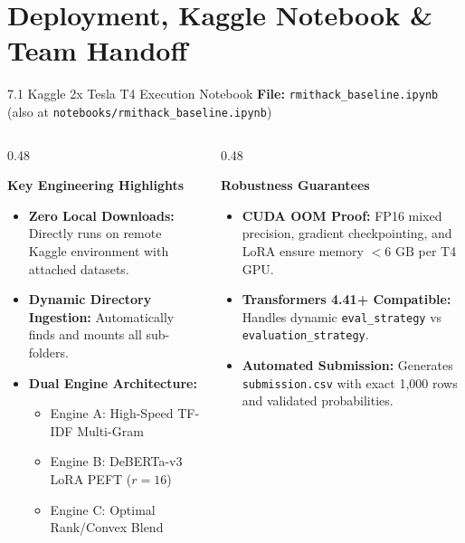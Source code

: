 \documentclass[aspectratio=169]{beamer}
\begin{document}
\section{Deployment, Kaggle Notebook \& Team Handoff}

\begin{frame}{7.1 Kaggle 2x Tesla T4 Execution Notebook}
\textbf{File:} \texttt{rmithack\_baseline.ipynb} (also at \texttt{notebooks/rmithack\_baseline.ipynb})

\vspace{0.25cm}
\begin{columns}[T]
\begin{column}{0.48\textwidth}
\begin{block}{\textbf{Key Engineering Highlights}}
\begin{itemize}
    \item \textbf{Zero Local Downloads:} Directly runs on remote Kaggle environment with attached datasets.
    \item \textbf{Dynamic Directory Ingestion:} Automatically finds and mounts all sub-folders.
    \item \textbf{Dual Engine Architecture:}
    \begin{itemize}
        \item Engine A: High-Speed TF-IDF Multi-Gram
        \item Engine B: DeBERTa-v3 LoRA PEFT ($r=16$)
        \item Engine C: Optimal Rank/Convex Blend
    \end{itemize}
\end{itemize}
\end{block}
\end{column}

\begin{column}{0.48\textwidth}
\begin{block}{\textbf{Robustness Guarantees}}
\begin{itemize}
    \item \textbf{CUDA OOM Proof:} FP16 mixed precision, gradient checkpointing, and LoRA ensure memory $< 6\text{ GB}$ per T4 GPU.
    \item \textbf{Transformers 4.41+ Compatible:} Handles dynamic \texttt{eval\_strategy} vs \texttt{evaluation\_strategy}.
    \item \textbf{Automated Submission:} Generates \texttt{submission.csv} with exact 1,000 rows and validated probabilities.
\end{itemize}
\end{block}
\end{column}
\end{columns}
\end{frame}
\end{document}
